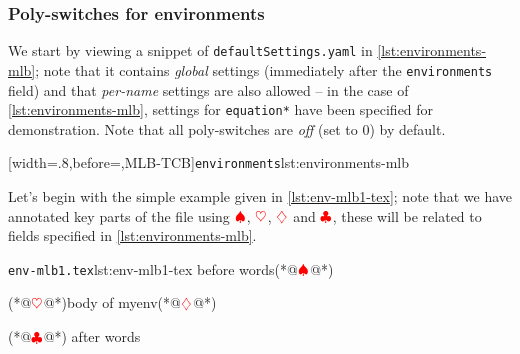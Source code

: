 \subsubsection{Poly-switches for environments}\label{sec:modifylinebreaks-environments}
 We start by viewing a snippet of \texttt{defaultSettings.yaml} in
 \cref{lst:environments-mlb}; note that it contains \emph{global} settings (immediately
 after the \texttt{environments} field) and that \emph{per-name} settings are also allowed
 -- in the case of \cref{lst:environments-mlb}, settings for \texttt{equation*} have been
 specified for demonstration. Note that all poly-switches are \emph{off} (set to 0) by
 default.   

 [width=.8\linewidth,before=\centering,MLB-TCB]{\texttt{environments}}{lst:environments-mlb}

 Let's begin with the simple example given in \cref{lst:env-mlb1-tex}; note that we have
 annotated key parts of the file using $\color{red}\spadesuit$, $\color{red}\heartsuit$,
 $\color{red}\diamondsuit$ and $\color{red}\clubsuit$, these will be related to fields
 specified in \cref{lst:environments-mlb}. 

 \begin{cmhlistings}[style=tcblatex,escapeinside={(*@}{@*)}]{\texttt{env-mlb1.tex}}{lst:env-mlb1-tex}
before words(*@$\color{red}\spadesuit$@*) \begin{myenv}(*@$\color{red}\heartsuit$@*)body of myenv(*@$\color{red}\diamondsuit$@*)\end{myenv}(*@$\color{red}\clubsuit$@*) after words
\end{cmhlistings}

